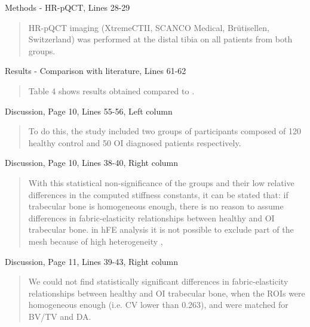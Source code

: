 \documentclass{AR2RC}
\begin{document}
Methods - HR-pQCT, Lines 28-29
\begin{quote}
	HR-pQCT imaging (XtremeCTII, SCANCO Medical, Brütisellen, Switzerland) was performed at the distal tibia on all patients from both groups. 
\end{quote}

Results - Comparison with literature, Lines 61-62
\begin{quote}
	Table 4 shows results obtained  compared to  .
\end{quote}

Discussion, Page 10, Lines 55-56, Left column
\begin{quote}
	To do this, the study included two groups of participants composed of 120 healthy control and 50 OI diagnosed patients respectively. 
\end{quote}

Discussion, Page 10, Lines 38-40, Right column
\begin{quote}
	With this statistical non-significance of the groups and their low relative differences in the computed stiffness constants, it can be stated that: if trabecular bone is homogeneous enough, there is no reason to assume differences in fabric-elasticity relationships between healthy and OI trabecular bone.  in hFE analysis  it is not possible to exclude part of the mesh because of high heterogeneity , 
\end{quote}

Discussion, Page 11, Lines 39-43, Right column
\begin{quote}
	We could not find statistically significant differences in fabric-elasticity relationships between healthy and OI trabecular bone, when the ROIs were homogeneous enough  (i.e. CV lower than 0.263), and were matched for BV/TV and DA. 
\end{quote}
\end{document}
